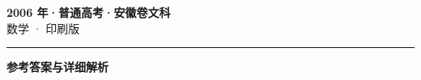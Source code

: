 \documentclass[zihao=5, a4paper]{ctexart}
\begin{document}
\begin{center}
  {\Large\bfseries 2006 年·普通高考·安徽卷文科}\\[4pt]
  {\large 数学 · 印刷版}
\end{center}
\medskip
{}

\par\bigskip\hrule\bigskip
{}
\begin{center}{\large\bfseries 参考答案与详细解析}\end{center}
\smallskip

\end{document}
